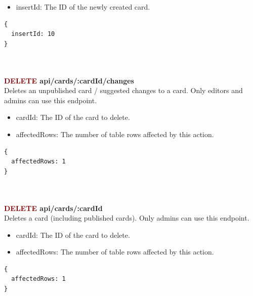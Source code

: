 \documentclass[onecolumn, draftclsnofoot,10pt, compsoc, usenames, dvipsnames]{IEEEtran}
\begin{document}
\begin{itemize}
  \item insertId: The ID of the newly created card.
\end{itemize}
\begin{lstlisting}[caption=Example Response]
{ 
  insertId: 10
}
\end{lstlisting}
\\~\\


\noindent
\textbf{\textcolor{Maroon}{DELETE} api/cards/:cardId/changes} \\
Deletes an unpublished card / suggested changes to a card. Only editors and admins can use this endpoint.
\begin{itemize}
  \item cardId: The ID of the card to delete.
  \item affectedRows: The number of table rows affected by this action.
\end{itemize}
\begin{lstlisting}[caption=Example Response]
{ 
  affectedRows: 1
}
\end{lstlisting}
\\~\\


\noindent
\textbf{\textcolor{Maroon}{DELETE} api/cards/:cardId} \\
Deletes a card (including published cards). Only admins can use this endpoint.
\begin{itemize}
    \item cardId: The ID of the card to delete.
    \item affectedRows: The number of table rows affected by this action.
\end{itemize}
\begin{lstlisting}[caption=Example Response]
{ 
  affectedRows: 1
}
\end{lstlisting}
\\~\\
\end{document}
